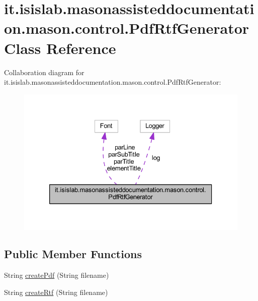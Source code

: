 \hypertarget{classit_1_1isislab_1_1masonassisteddocumentation_1_1mason_1_1control_1_1_pdf_rtf_generator}{\section{it.\-isislab.\-masonassisteddocumentation.\-mason.\-control.\-Pdf\-Rtf\-Generator Class Reference}
\label{classit_1_1isislab_1_1masonassisteddocumentation_1_1mason_1_1control_1_1_pdf_rtf_generator}
}


Collaboration diagram for it.\-isislab.\-masonassisteddocumentation.\-mason.\-control.\-Pdf\-Rtf\-Generator\-:
\nopagebreak
\begin{figure}[H]
\begin{center}
\leavevmode
\includegraphics[width=333pt]{classit_1_1isislab_1_1masonassisteddocumentation_1_1mason_1_1control_1_1_pdf_rtf_generator__coll__graph}
\end{center}
\end{figure}
\subsection*{Public Member Functions}
\begin{DoxyCompactItemize}
\item 
String \hyperlink{classit_1_1isislab_1_1masonassisteddocumentation_1_1mason_1_1control_1_1_pdf_rtf_generator_a9fce71372853c35cc50c62bbd75789eb}{create\-Pdf} (String filename)
\item 
String \hyperlink{classit_1_1isislab_1_1masonassisteddocumentation_1_1mason_1_1control_1_1_pdf_rtf_generator_ab87d8842aba028de4988efc8f9099ff5}{create\-Rtf} (String filename)
\end{DoxyCompactItemize}

